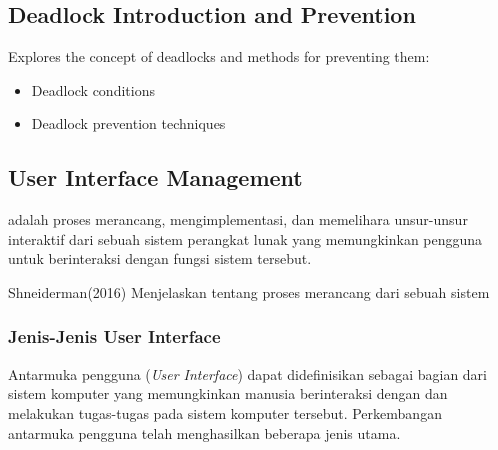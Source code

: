 \documentclass[12pt]{article}
\begin{document}
\subsection{Deadlock Introduction and Prevention}
Explores the concept of deadlocks and methods for preventing them:
\begin{itemize}
    \item Deadlock conditions
    \item Deadlock prevention techniques
\end{itemize}

\subsection{User Interface Management}


 adalah proses merancang, mengimplementasi, dan memelihara unsur-unsur interaktif dari sebuah sistem perangkat lunak yang memungkinkan pengguna untuk berinteraksi dengan fungsi sistem tersebut.

  Shneiderman(2016) Menjelaskan tentang proses merancang dari sebuah sistem 
 

\subsubsection{Jenis-Jenis User Interface}
\par Antarmuka pengguna (\textit{User Interface}) dapat didefinisikan sebagai bagian dari sistem komputer yang memungkinkan manusia berinteraksi dengan dan melakukan tugas-tugas pada sistem komputer tersebut. Perkembangan antarmuka pengguna telah menghasilkan beberapa jenis utama. 
\end{document}
